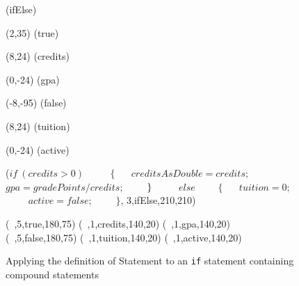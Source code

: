 




\begin {figure}

\Draw

\MarkLoc(ifElse)

\Move(2,35)
\MarkLoc(true)

\Move(8,24)
\MarkLoc(credits)

\Move(0,-24)
\MarkLoc(gpa)

\Move(-8,-95)
\MarkLoc(false)

\Move(8,24)
\MarkLoc(tuition)

\Move(0,-24)
\MarkLoc(active)


\boxIt ($if~(credits > 0)$ \hfill				~~~~
       $\{ \hspace{20pt}creditsAsDouble = credits; $\hfill	~~~~
       \hspace{24pt} $gpa = gradePoints / credits;$\hfill	~~~~
	$\}\hfill$						~~~~
       	$else$\hfill						~~~~
	$\{  \hspace{20pt}tuition = 0; $\hfill			~~~~
	\hspace{24pt}$active = false; $\hfill 			~~~~
	$\}$\hfill,
	3,ifElse,210,210)

\boxIt (~,5,true,180,75)
\boxIt (~,1,credits,140,20)
\boxIt (~,1,gpa,140,20)
\boxIt (~,5,false,180,75)
\boxIt (~,1,tuition,140,20)
\boxIt (~,1,active,140,20)

\EndDraw

\caption {Applying the definition of 
Statement to an \texttt{if} statement containing
compound statements	}

\label {fig:compoundStmt}

\end {figure}



